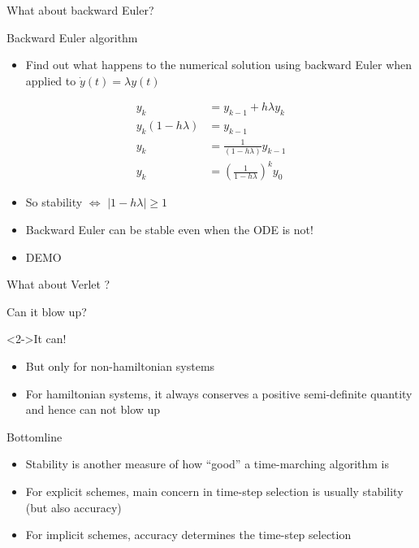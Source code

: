 \documentclass[presentation]{beamer}
\newcommand{\abs}[1]{\left\lvert#1\right\rvert}
\begin{document}
\begin{frame}[label={sec:org8bd53c0}]{What about backward Euler?}
\begin{block}{Backward Euler algorithm}
\begin{itemize}
\item Find out what happens to the numerical solution using backward Euler when applied to
\(\dot{y}(t) = \lambda y(t)\)
\end{itemize}
\begin{equation*}
\begin{aligned} y_k & = y_{k-1} + h \lambda y_{k} \\
y_k (1 - h \lambda) &= y_{k-1} \\
y_k &= \frac{1}{(1 - h \lambda)}y_{k-1} \\
y_k &= \left( \frac{1}{1 - h \lambda} \right)^k y_{0}
\end{aligned}
\end{equation*}
\begin{itemize}
\item So stability \(\Leftrightarrow\) \(\abs{1 - h \lambda} \geq 1\)
\item Backward Euler can be stable even when the ODE is not!
\item \alert{DEMO}
\end{itemize}
\end{block}
\end{frame}
\begin{frame}[label={sec:org86ff431}]{What about Verlet ?}
\begin{block}{Can it blow up?}
\end{block}
\begin{block}<2->{It can!}
\begin{itemize}
\item But only for non-hamiltonian systems
\item For hamiltonian systems, it always conserves a positive semi-definite
quantity and hence can not blow up
\end{itemize}
\end{block}
\end{frame}
\begin{frame}[label={sec:org17636ac}]{Bottomline}
\begin{itemize}
\item Stability is another measure of how ``good'' a time-marching algorithm is
\item For \alert{explicit} schemes, main concern in time-step selection is usually
\alert{stability} (but also accuracy)
\item For \alert{implicit} schemes, \alert{accuracy} determines the time-step selection
\end{itemize}
\end{frame}
\end{document}
